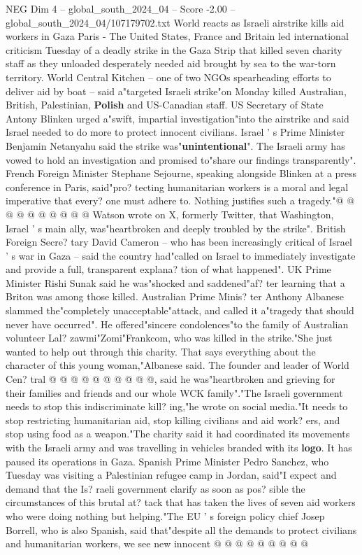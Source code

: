 \begin{textsample}{NEG Dim 4 – global\_south\_2024\_04 – Score -2.00 – global\_south\_2024\_04/107179702.txt}  \label{ex:f4_neg_191}
World reacts as Israeli airstrike kills aid workers in Gaza Paris - The United States, France and Britain led international criticism Tuesday of a deadly strike in the Gaza Strip that killed seven charity staff as they unloaded desperately needed aid brought by sea to the war-torn territory.
World Central Kitchen -- one of two NGOs spearheading efforts to deliver aid by boat -- said a"targeted Israeli strike"on Monday killed Australian, British, Palestinian, \textbf{Polish} and US-Canadian staff.
US Secretary of State Antony Blinken urged a"swift, impartial investigation"into the airstrike and said Israel needed to do more to protect innocent civilians.
Israel ' s Prime Minister Benjamin Netanyahu said the strike was"\textbf{unintentional}".
The Israeli army has vowed to hold an investigation and promised to"share our findings transparently".
French Foreign Minister Stephane Sejourne, speaking alongside Blinken at a press conference in Paris, said"pro? tecting humanitarian workers is a moral and legal imperative that every? one must adhere to.
Nothing justifies such a tragedy."@ @ @ @ @ @ @ @ @ @ Watson wrote on X, formerly Twitter, that Washington, Israel ' s main ally, was"heartbroken and deeply troubled by the strike".
British Foreign Secre? tary David Cameron -- who has been increasingly critical of Israel ' s war in Gaza -- said the country had"called on Israel to immediately investigate and provide a full, transparent explana? tion of what happened".
UK Prime Minister Rishi Sunak said he was"shocked and saddened"af? ter learning that a Briton was among those killed.
Australian Prime Minis? ter Anthony Albanese slammed the"completely unacceptable"attack, and called it a"tragedy that should never have occurred".
He offered"sincere condolences"to the family of Australian volunteer Lal? zawmi"Zomi"Frankcom, who was killed in the strike."She just wanted to help out through this charity.
That says everything about the character of this young woman,"Albanese said.
The founder and leader of World Cen? tral @ @ @ @ @ @ @ @ @ @, said he was"heartbroken and grieving for their families and friends and our whole WCK family"."The Israeli government needs to stop this indiscriminate kill? ing,"he wrote on social media."It needs to stop restricting humanitarian aid, stop killing civilians and aid work? ers, and stop using food as a weapon."The charity said it had coordinated its movements with the Israeli army and was travelling in vehicles branded with its \textbf{logo}.
It has paused its operations in Gaza.
Spanish Prime Minister Pedro Sanchez, who Tuesday was visiting a Palestinian refugee camp in Jordan, said"I expect and demand that the Is? raeli government clarify as soon as pos? sible the circumstances of this brutal at? tack that has taken the lives of seven aid workers who were doing nothing but helping."The EU ' s foreign policy chief Josep Borrell, who is also Spanish, said that"despite all the demands to protect civilians and humanitarian workers, we see new innocent @ @ @ @ @ @ @ @ @

\end{textsample}
